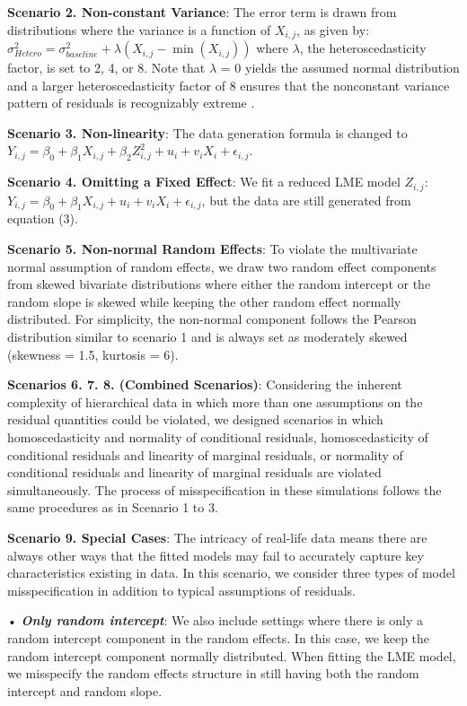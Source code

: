\documentclass[12pt]{article}
\begin{document}
\textbf{Scenario 2. Non-constant Variance}: The error term is drawn from
distributions where the variance is a function of \(X_{i,j}\), as given
by:
\(\sigma_{Hetero}^2 = \sigma_{baseline}^2 + \lambda(X_{i,j}-\min(X_{i,j}))\)
where \(\lambda\), the heteroscedasticity factor, is set to 2, 4, or 8.
Note that \(\lambda\) = 0 yields the assumed normal distribution and a
larger heteroscedasticity factor of 8 ensures that the nonconstant
variance pattern of residuals is recognizably extreme
\citep{Schielzeth2020-gp}.

\textbf{Scenario 3. Non-linearity}: The data generation formula is
changed to
\(Y_{i,j}= \beta_0 + \beta_1 X_{i,j} + \beta_2 Z_{i,j}^2 + u_i + v_i X_i + \epsilon_{i,j}\).

\textbf{Scenario 4. Omitting a Fixed Effect}: We fit a reduced LME model
\(Z_{i,j}\):
\(Y_{i,j}= \beta_0 + \beta_1 X_{i,j} + u_i + v_i X_i + \epsilon_{i,j}\),
but the data are still generated from equation (3).

\textbf{Scenario 5. Non-normal Random Effects}: To violate the
multivariate normal assumption of random effects, we draw two random
effect components from skewed bivariate distributions where either the
random intercept or the random slope is skewed while keeping the other
random effect normally distributed. For simplicity, the non-normal
component follows the Pearson distribution similar to scenario 1 and is
always set as moderately skewed (skewness = 1.5, kurtosis = 6).

\textbf{Scenarios 6. 7. 8. (Combined Scenarios)}: Considering the
inherent complexity of hierarchical data in which more than one
assumptions on the residual quantities could be violated, we designed
scenarios in which homoscedasticity and normality of conditional
residuals, homoscedasticity of conditional residuals and linearity of
marginal residuals, or normality of conditional residuals and linearity
of marginal residuals are violated simultaneously. The process of
misspecification in these simulations follows the same procedures as in
Scenario 1 to 3.

\textbf{Scenario 9. Special Cases}: The intricacy of real-life data
means there are always other ways that the fitted models may fail to
accurately capture key characteristics existing in data. In this
scenario, we consider three types of model misspecification in addition
to typical assumptions of residuals.

• \textbf{\emph{Only random intercept}}: We also include settings where
there is only a random intercept component in the random effects. In
this case, we keep the random intercept component normally distributed.
When fitting the LME model, we misspecify the random effects structure
in still having both the random intercept and random slope.
\end{document}

